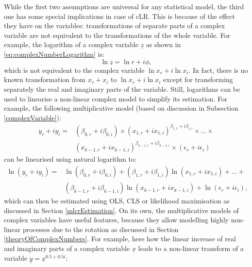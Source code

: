 \documentclass[
]{book}
\begin{document}
While the first two assumptions are universal for any statistical model, the third one has some special implications in case of cLR. This is because of the effect they have on the variables: transformations of separate parts of a complex variable are not equivalent to the transformations of the whole variable. For example, the logarithm of a complex variable \(\underline{z}\) as shown in \eqref{eq:complexNumberLogarithm} is:
\begin{equation*}
    \ln \underline{z} = \ln r + i \phi ,
\end{equation*}
which is not equivalent to the complex variable \(\ln x_r + i \ln x_i\). In fact, there is no known transformation from \(x_r + x_i\) to \(\ln x_r + i \ln x_i\) except for transforming separately the real and imaginary parts of the variable. Still, logarithms can be used to linearise a non-linear complex model to simplify its estimation. For example, the following multiplicative model (based on discussion in Subsection \ref{complexVariable}):
\begin{equation*}
    \begin{aligned}
    y_{r} + i y_{i} = & (\beta_{0,r} + i \beta_{0,i}) \times (x_{1,r} + i x_{1,i}) ^{\beta_{1,r} + i \beta_{1,i}} \times \dots \times \\
                      & (x_{k-1,r} + i x_{k-1,i}) ^{\beta_{k-1,r} + i \beta_{k-1,i}} \times (\epsilon_{r} + i \epsilon_{i})
    \end{aligned}
\end{equation*}
can be linearised using natural logarithm to:
\begin{equation*}
    \begin{aligned}
    \ln (y_{r} + i y_{i}) = & \ln (\beta_{0,r} + i \beta_{0,i}) + (\beta_{1,r} + i \beta_{1,i}) \ln(x_{1,r} + i x_{1,i}) + \dots + \\
                            & (\beta_{k-1,r} + i \beta_{k-1,i}) \ln (x_{k-1,r} + i x_{k-1,i}) + \ln (\epsilon_{r} + i \epsilon_{i}),
    \end{aligned}
\end{equation*}
which can then be estimated using OLS, CLS or likelihood maximisation as discussed in Section \ref{mlcrEstimation}. On its own, the multiplicative models of complex variables have useful features, because they allow modelling highly non-linear processes due to the rotation as discussed in Section \ref{theoryOfComplexNumbers}. For example, here how the linear increase of real and imaginary parts of a complex variable \(\underline{x}\) leads to a non-linear transform of a variable \(\underline{y}=\underline{x}^{0.5+0.5i}\):
\end{document}
